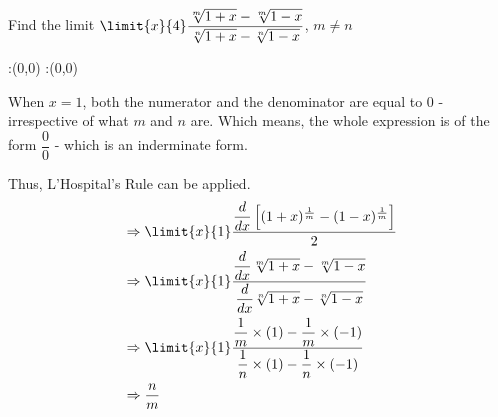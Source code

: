 



\POWER{}\p
\providecommand\e{ (1+x)^{\frac{1}{m}} - (1-x)^{\frac{1}{m}} }

\question[4] Find the limit $\limit{x}{\vbone}\dfrac{\sqrt[m]{1+x} - \sqrt[m]{1-x}}{\sqrt[n]{1+x} - \sqrt[n]{1-x}}$, $m\neq n$

\watchout

\ifprintanswers
  \begin{marginfigure}
      :(0,0)
      :(0,0)
    \figdrawbegin{}
      \figdrawline [100,101]
    \figdrawend
    \figvisu{\figBoxA}{}{%
    }
    \centerline{\box\figBoxA}
  \end{marginfigure}
\fi 

\begin{solution}[\halfpage]
	When $x=1$, both the numerator and the denominator are equal to $0$ - irrespective of what $m$ and $n$ are. 
	Which means, the whole expression is of the form $\dfrac{0}{0}$ - which is an inderminate form.

	Thus, L'Hospital's Rule can be applied. 
\begin{align}
&\Rightarrow \limit{x}{1}\dfrac{ \dfrac{d}{dx} \left[  \e \right] }{2} \\
&\Rightarrow \limit{x}{1}\dfrac{\dfrac{d}{dx}\sqrt[m]{1+x} - \sqrt[m]{1-x}} {\dfrac{d}{dx} \sqrt[n]{1+x} - \sqrt[n]{1-x}}\\
&\Rightarrow \limit{x}{1} \dfrac{\dfrac{1}{m} \times (1) - \dfrac{1}{m} \times (-1)}{\dfrac{1}{n}\times (1) - \dfrac{1}{n}\times(-1)}\\
&\Rightarrow \dfrac{n}{m}
\end{align}
\end{solution}


